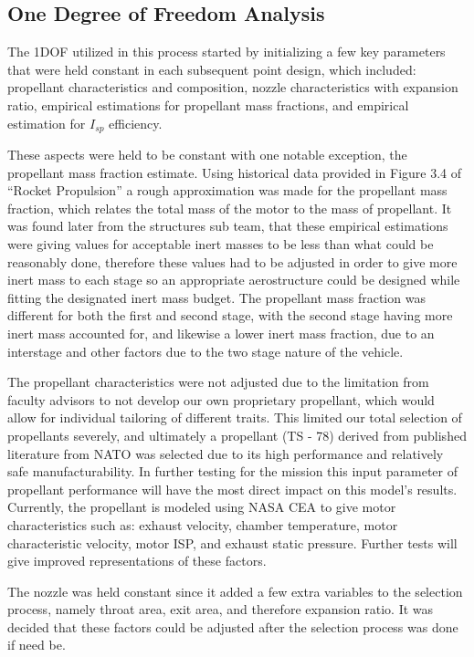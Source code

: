 \subsection{One Degree of Freedom Analysis}
The 1DOF utilized in this process started by initializing a few key parameters that were held constant in each subsequent point design, which included: propellant characteristics and composition, nozzle characteristics with expansion ratio, empirical estimations for propellant mass fractions, and empirical estimation for \(I_{sp}\) efficiency.

These aspects were held to be constant with one notable exception, the propellant mass fraction estimate. Using historical data provided in Figure 3.4 of ``Rocket Propulsion'' \cite{heister-rocket-propulsion} a rough approximation was made for the propellant mass fraction, which relates the total mass of the motor to the mass of propellant. It was found later from the structures sub team, that these empirical estimations were giving values for acceptable inert masses to be less than what could be reasonably done, therefore these values had to be adjusted in order to give more inert mass to each stage so an appropriate aerostructure could be designed while fitting the designated inert mass budget. The propellant mass fraction was different for both the first and second stage, with the second stage having more inert mass accounted for, and likewise a lower inert mass fraction, due to an interstage and other factors due to the two stage nature of the vehicle.

The propellant characteristics were not adjusted due to the limitation from faculty advisors to not develop our own proprietary propellant, which would allow for individual tailoring of different traits. This limited our total selection of propellants severely, and ultimately a propellant (TS - 78) derived from published literature from NATO was  selected due to its high performance and relatively safe manufacturability. In further testing for the mission this input parameter of propellant performance will have the most direct impact on this model’s results. Currently, the propellant is modeled using NASA CEA to give motor characteristics such as: exhaust velocity, chamber temperature, motor characteristic velocity, motor ISP, and exhaust static pressure. Further tests will give improved representations of these factors.

The nozzle was held constant since it added a few extra variables to the selection process, namely throat area, exit area, and therefore expansion ratio. It was decided that these factors could be adjusted after the selection process was done if need be.


